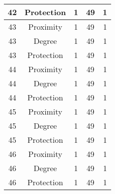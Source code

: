 \documentclass[results.tex]{subfiles}
\begin{document}
\begin{center}
\begin{tabular}{| c || c | c | c | c |}
            \hline
            42                      & Protection                   & 1                      & 49                      & 1                    \\
            \hline
            43                      & Proximity                    & 1                      & 49                      & 1                    \\
            \hline
            43                      & Degree                       & 1                      & 49                      & 1                    \\
            \hline
            43                      & Protection                   & 1                      & 49                      & 1                    \\
            \hline
            44                      & Proximity                    & 1                      & 49                      & 1                    \\
            \hline
            44                      & Degree                       & 1                      & 49                      & 1                    \\
            \hline
            44                      & Protection                   & 1                      & 49                      & 1                    \\
            \hline
            45                      & Proximity                    & 1                      & 49                      & 1                    \\
            \hline
            45                      & Degree                       & 1                      & 49                      & 1                    \\
            \hline
            45                      & Protection                   & 1                      & 49                      & 1                    \\
            \hline
            46                      & Proximity                    & 1                      & 49                      & 1                    \\
            \hline
            46                      & Degree                       & 1                      & 49                      & 1                    \\
            \hline
            46                      & Protection                   & 1                      & 49                      & 1                    \\

\end{tabular}
\end{center}
\end{document}
